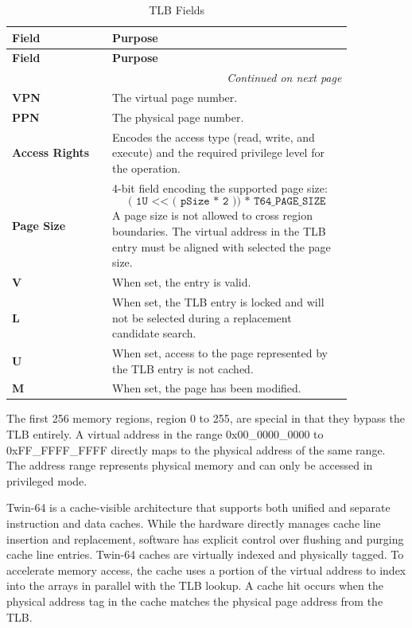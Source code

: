 \begin{longtable}{@{}p{0.25\linewidth}p{0.6\linewidth}@{}}
    \caption{TLB Fields} \\
    \toprule
    \textbf{Field} & \textbf{Purpose} \\
    \midrule
    \endfirsthead
    \toprule
    \textbf{Field} & \textbf{Purpose} \\
    \midrule
    \endhead
    \midrule
    \multicolumn{2}{r}{\textit{Continued on next page}} \\
    \midrule
    \endfoot
    \bottomrule
    \endlastfoot
    \textbf{VPN} & The virtual page number. \\
    \midrule
    \textbf{PPN} & The physical page number. \\
    \midrule
    \textbf{Access Rights} & Encodes the access type (read, write, and execute) and the required privilege level for the operation. \\
    \midrule
    \textbf{Page Size} & 4-bit field encoding the supported page size: 
    		\[ \texttt{( 1U << ( pSize * 2 )) * T64\_PAGE\_SIZE} \] 
    A page size is not allowed to cross region boundaries. The virtual address in the TLB entry must be aligned with selected the page size.\\
    \midrule
    \textbf{V} & When set, the entry is valid. \\
    \midrule
    \textbf{L} & When set, the TLB entry is locked and will not be selected during a replacement candidate search. \\
    \midrule
    \textbf{U} & When set, access to the page represented by the TLB entry is not cached. \\
    \midrule
    \textbf{M} & When set, the page has been modified. \\
\end{longtable}

The first 256 memory regions, region 0 to 255, are special in that they bypass the TLB entirely. A virtual address in the range 0x00\_0000\_0000 to 0xFF\_FFFF\_FFFF directly maps to the physical address of the same range. The address range represents physical memory and can only be accessed in privileged mode. 


Twin-64 is a cache-visible architecture that supports both unified and separate instruction and data caches. While the hardware directly manages cache line insertion and replacement, software has explicit control over flushing and purging cache line entries. Twin-64 caches are virtually indexed and physically tagged. To accelerate memory access, the cache uses a portion of the virtual address to index into the arrays in parallel with the TLB lookup. A cache hit occurs when the physical address tag in the cache matches the physical page address from the TLB.

